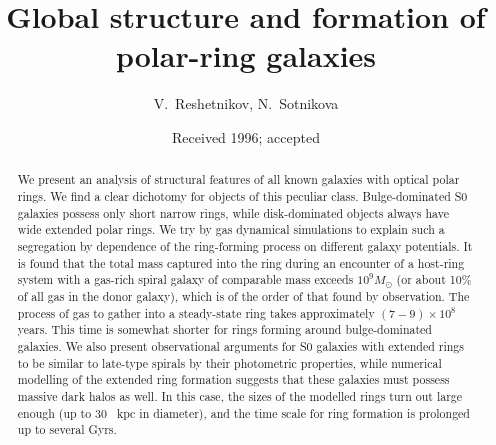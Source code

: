 



\title{ Global structure and formation of polar-ring galaxies}

\author{V.~Reshetnikov, N.~Sotnikova}



\date{Received 1996; accepted}

\maketitle

\begin{abstract}
We present an analysis of structural features of all known galaxies 
with optical polar rings. 
We find a clear dichotomy for objects of this peculiar 
class. Bulge-dominated S0 galaxies possess only short 
narrow rings, while disk-dominated objects always have wide 
extended polar rings. We try by gas dynamical simulations 
to explain such a segregation by dependence of
the ring-forming 
process on different galaxy potentials. It is found that the 
total mass captured into the ring during an encounter of a 
host-ring system with a gas-rich spiral galaxy of comparable 
mass exceeds $10^9 M_{\odot}$ (or about 10\% of all gas in the
donor galaxy), which is of the order of 
that found by observation. The process of gas to gather 
into a steady-state ring takes approximately $(7 - 9)\times10^8$ 
years. This time is somewhat shorter for rings forming around 
bulge-dominated galaxies. We also present observational arguments 
for S0 galaxies with extended rings to be similar to late-type 
spirals by their photometric properties, while numerical modelling 
of the extended ring formation suggests that these 
galaxies must possess massive dark halos as well. In this case, 
the sizes of the modelled rings turn out large enough (up to 30~ kpc 
in diameter), and the time scale for ring formation is prolonged 
up to several Gyrs.


\end{abstract}

